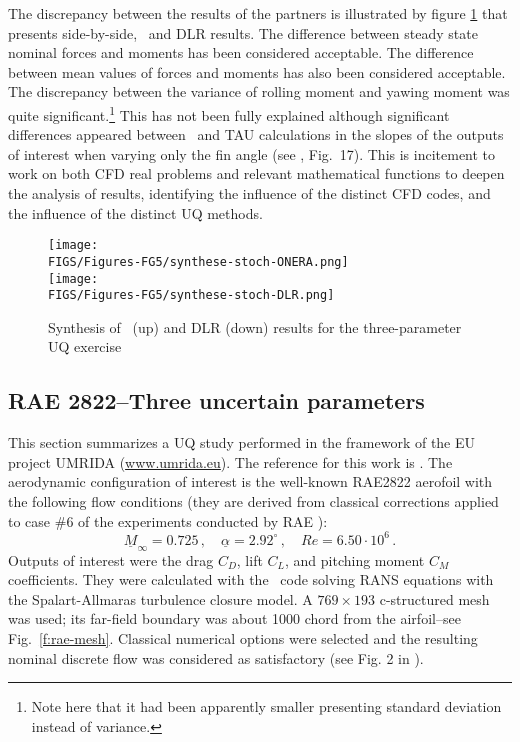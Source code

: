 \documentclass{eurosae}
\def\vr{\vspace{3mm}}
\newcommand{\nominal}[1]{\underline{#1}}
\newcommand{\lift}{C_L}
\newcommand{\drag}{C_D}
\newcommand{\moment}{C_M}
\newcommand{\Mach}{M}
\newcommand{\fref}[1]{Fig.~\ref{#1}}
\begin{document}
The discrepancy between the results of the partners is illustrated by figure \ref{f:fg5-tab} that presents side-by-side, \Onera\ and DLR results. The difference between steady state nominal forces and moments has been considered acceptable. The difference between mean values of forces and moments has also been considered acceptable. The discrepancy between the variance of rolling moment and yawing moment was quite significant.\footnote{Note here that it had been apparently smaller presenting standard deviation instead of variance.} This has not been fully explained although significant differences appeared between \elsA\ and TAU calculations in the slopes of the outputs of interest when varying only the fin angle (see \cite{JPGoeGra_17}, Fig.~17). This is incitement to work on both CFD real problems and relevant mathematical functions to deepen the analysis of results, identifying the influence of the distinct CFD codes, and the influence of the distinct UQ methods.
%
\begin{figure}[!h]
\begin{center}
\texttt{[image: \\FIGS/Figures-FG5/synthese-stoch-ONERA.png]}
\vr\\
\texttt{[image: \\FIGS/Figures-FG5/synthese-stoch-DLR.png]}
\end{center}
\caption{Synthesis of \Onera\ (up) and DLR (down) results for the three-parameter UQ exercise}
\label{f:fg5-tab}
\end{figure}
%

\subsection{RAE 2822--Three uncertain parameters}\label{sec:RAE2822}
%
This section summarizes a UQ study performed in the framework of the EU project UMRIDA (\href{http://www.umrida.eu}{www.umrida.eu}). 
 The reference for this work is \cite{SavResJP_16}. The aerodynamic configuration of interest is the well-known RAE2822 aerofoil with the following flow conditions (they are derived from classical corrections applied to case \#6 of the experiments conducted by RAE \cite{CooMcDFir_79}): 
%
 $$ \nominal{\Mach}_\infty=0.725\,,\quad\nominal{\alpha}=2.92^\circ\,,\quad Re=6.50\cdot10^6\,. $$
%
Outputs of interest were the drag $\drag$, lift $\lift$, and pitching moment $\moment$ coefficients. They were calculated with the \elsA\ code \cite{CamHeiPlo_13} solving RANS equations with the Spalart-Allmaras turbulence closure model. A $769\times 193$ c-structured mesh was used; its far-field boundary was about 1000 chord from the airfoil--see \fref{f:rae-mesh}.
Classical numerical options were selected and the resulting nominal discrete flow was considered as satisfactory (see Fig. 2 in \cite{SavResJP_16}). 
\end{document}

